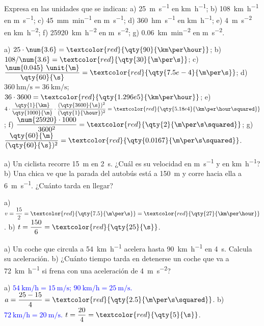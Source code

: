 \begin{exercise}
    Expresa en las unidades que se indican: a) \qty{25}{\m\per\s} en \unit{\km\per\hour}; b) \qty{108}{\km\per\hour} en
    \unit{\m\per\s}; c) \qty{45}{\mm\per\minute} en \unit{\m\per\s}; d) \qty{360}{\hecto\metre\per\s} en \unit{\km\per\hour};
    e) \qty{4}{\m\per\s\squared} en \unit{\km\per\hour\squared}; f) \qty{25920}{\km\per\hour\squared} en \unit{\m\per\s\squared};
    g) \qty{0.06}{\km\per\minute\squared} en \unit{\m\per\s\squared}.
    \begin{solu}
        a) \(25 \cdot \num{3.6} = \textcolor{red}{\qty{90}{\km\per\hour}}\); b) \(108 / \num{3.6} = \textcolor{red}{\qty{30}{\m\per\s}}\);
        c) \(\dfrac{\num{0.045}~\unit{\m}}{\qty{60}{\s}} = \textcolor{red}{\qty{7.5e-4}{\m\per\s}}\);
        d) \(\qty{360}{\hecto\metre\per\s} = \qty{36}{\km\per\s}\); \(36 \cdot 3600 = \textcolor{red}{\qty{1.296e5}{\km\per\hour}}\);
        e) \(4 \cdot \dfrac{\qty{1}{\km}}{\qty{1000}{\m}} \cdot \dfrac{(\qty{3600}{\s})^2}{(\qty{1}{\hour})^2} = \textcolor{red}{\qty{5.18e4}{\km\per\hour\squared}}\);
        f) \(\dfrac{\num{25920} \cdot 1000}{3600^2} = \textcolor{red}{\qty{2}{\m\per\s\squared}}\);
        g) \(\dfrac{\qty{60}{\m}}{(\qty{60}{\s})^2} = \textcolor{red}{\qty{0.0167}{\m\per\s\squared}}\).
    \end{solu}
\end{exercise}

\begin{exercise}
    a) Un ciclista recorre \qty{15}{\m} en \qty{2}{\s}. ¿Cuál es su velocidad en \unit{\m\per\s} y en \unit{\km\per\hour}?
    b) Una chica ve que la parada del autobús está a \qty{150}{\m} y corre hacia ella a \qty{6}{\m\per\s}. ¿Cuánto tarda en llegar?
    \begin{solu}
        a) \(v = \dfrac{15}{2} = \textcolor{red}{\qty{7.5}{\m\per\s}} = \textcolor{red}{\qty{27}{\km\per\hour}}\).
        b) \(t = \dfrac{150}{6} = \textcolor{red}{\qty{25}{\s}}\).
    \end{solu}
\end{exercise}

\begin{exercise}
    a) Un coche que circula a \qty{54}{\km\per\hour} acelera hasta \qty{90}{\km\per\hour} en \qty{4}{\s}. Calcula su aceleración.
    b) ¿Cuánto tiempo tarda en detenerse un coche que va a \qty{72}{\km\per\hour} si frena con una aceleración de
    \qty{4}{\m\per\s\squared}?
    \begin{solu}
        a) \textcolor{blue}{\(\qty{54}{\km\per\hour} = \qty{15}{\m\per\s}\); \(\qty{90}{\km\per\hour} = \qty{25}{\m\per\s}\).}
        \(a = \dfrac{25 - 15}{4} = \textcolor{red}{\qty{2.5}{\m\per\s\squared}}\).
        b) \textcolor{blue}{\(\qty{72}{\km\per\hour} = \qty{20}{\m\per\s}\).} \(t = \dfrac{20}{4} = \textcolor{red}{\qty{5}{\s}}\).
    \end{solu}
\end{exercise}

